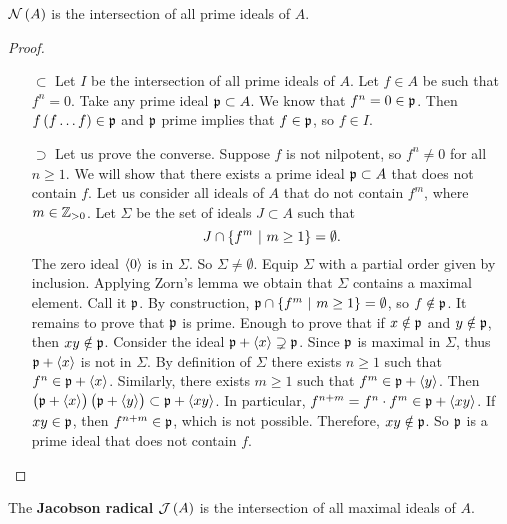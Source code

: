 \begin{proposition}
\label{prop:5.3}
$ \NNN\br{A} $ is the intersection of all prime ideals of $ A $.
\end{proposition}

\begin{proof}
\hfill
\begin{itemize}
\item[$ \subset $] Let $ I $ be the intersection of all prime ideals of $ A $. Let $ f \in A $ be such that $ f^n = 0 $. Take any prime ideal $ \mathfrak{p} \subset A $. We know that $ f^n = 0 \in \mathfrak{p} $. Then $ f\br{f \dots f} \in \ppp $ and $ \mathfrak{p} $ prime implies that $ f \in \mathfrak{p} $, so $ f \in I $.
\item[$ \supset $] Let us prove the converse. Suppose $ f $ is not nilpotent, so $ f^n \ne 0 $ for all $ n \ge 1 $. We will show that there exists a prime ideal $ \mathfrak{p} \subset A $ that does not contain $ f $. Let us consider all ideals of $ A $ that do not contain $ f^m $, where $ m \in \mathbb{Z}_{> 0} $. Let $ \Sigma $ be the set of ideals $ J \subset A $ such that
$$ J \cap \cbr{f^m \st m \ge 1} = \emptyset. $$
The zero ideal $ \left\langle 0 \right\rangle $ is in $ \Sigma $. So $ \Sigma \ne \emptyset $. Equip $ \Sigma $ with a partial order given by inclusion. Applying Zorn's lemma we obtain that $ \Sigma $ contains a maximal element. Call it $ \mathfrak{p} $. By construction, $ \ppp \cap \cbr{f^m \st m \ge 1} = \emptyset $, so $ f \notin \mathfrak{p} $. It remains to prove that $ \mathfrak{p} $ is prime. Enough to prove that if $ x \notin \mathfrak{p} $ and $ y \notin \mathfrak{p} $, then $ xy \notin \mathfrak{p} $. Consider the ideal $ \mathfrak{p} + \left\langle x \right\rangle \supsetneq \mathfrak{p} $. Since $ \mathfrak{p} $ is maximal in $ \Sigma $, thus $ \mathfrak{p} + \left\langle x \right\rangle $ is not in $ \Sigma $. By definition of $ \Sigma $ there exists $ n \ge 1 $ such that $ f^n \in \mathfrak{p} + \left\langle x \right\rangle $. Similarly, there exists $ m \ge 1 $ such that $ f^m \in \mathfrak{p} + \left\langle y \right\rangle $. Then $ \br{\ppp + \abr{x}}\br{\ppp + \abr{y}} \subset \ppp + \abr{xy} $. In particular, $ f^{n + m} = f^n \cdot f^m \in \mathfrak{p} + \left\langle xy \right\rangle $. If $ xy \in \mathfrak{p} $, then $ f^{n + m} \in \mathfrak{p} $, which is not possible. Therefore, $ xy \notin \mathfrak{p} $. So $ \mathfrak{p} $ is a prime ideal that does not contain $ f $.
\end{itemize}
\end{proof}

\pagebreak

\begin{definition}
The \textbf{Jacobson radical} $ \JJJ\br{A} $ is the intersection of all maximal ideals of $ A $.
\end{definition}

